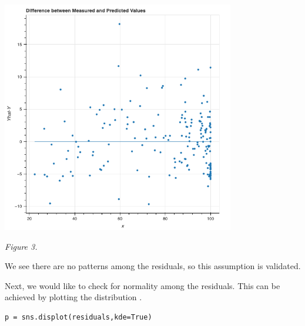 \documentclass[12pt]{article}
\begin{document}
\begin{center}
\includegraphics[width=4in]{Figures/figure3.png}\\
\end{center}

\begin{center}
    \textit{Figure 3.}
\end{center}

\newpage

\noindent
We see there are no patterns among the residuals, so this assumption is validated.

\vspace{15pt}

\noindent
Next, we would like to check for normality among the residuals. This can be achieved by plotting the distribution \citep{kaggleassumptions}.

\begin{lstlisting}
p = sns.displot(residuals,kde=True)
\end{lstlisting}
\end{document}
